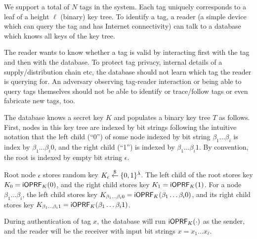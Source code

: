 \documentclass{article}
\begin{document}
We support a total of $N$ tags in the system. Each tag uniquely
corresponds to a leaf of a height $\ell$ (binary) key tree. To
identify a tag, a reader (a simple device which can query the tag and
has Internet connectivity) can talk to a database which knows all keys
of the key tree.

The reader wants to know whether a tag is valid by interacting first
with the tag and then with the database. To protect tag privacy,
internal details of a supply/distribution chain etc, the database
should not learn which tag the reader is querying for. An adversary
observing tag-reader interaction or being able to query tags
themselves should not be able to identify or trace/follow tags or
even fabricate new tags, too.


The database knows a secret key $K$ and populates a binary key tree
$T$ as follows. First, nodes in this key tree are indexed by bit
strings following the intuitive notation that the left child (``0'')
of some node indexed by bit string $\beta_1\ldots\beta_i$ is index by
$\beta_1\ldots\beta_i0$, and the right child (``1'') is indexed by
$\beta_1\ldots\beta_i1$. By convention, the root is indexed by
empty bit string $\epsilon$.

Root node $\epsilon$ stores random key
$K_{\epsilon}\stackrel{\$}{\leftarrow}\{0,1\}^\lambda$.  The left child of the root stores
key $K_0=\mathsf{i}\mathsf{OPRF}_K(0)$, and the right child stores key
$K_1=\mathsf{i}\mathsf{OPRF}_K(1)$. For a node $\beta_1\ldots\beta_i$,
the left child stores key
$K_{\beta_1\ldots\beta_i0}=\mathsf{i}\mathsf{OPRF}_K(\beta_1\ldots\beta_i0)$, and its
right child stores key
$K_{\beta_1\ldots\beta_i1}=\mathsf{i}\mathsf{OPRF}_K(\beta_1\ldots\beta_i1)$.

During authentication of tag $x$, the database will run
$\mathsf{i}\mathsf{OPRF}_K(\cdot)$ as the sender, and the reader will be the receiver
with input bit strings $x=x_1\ldots{}x_\ell$.
\end{document}
